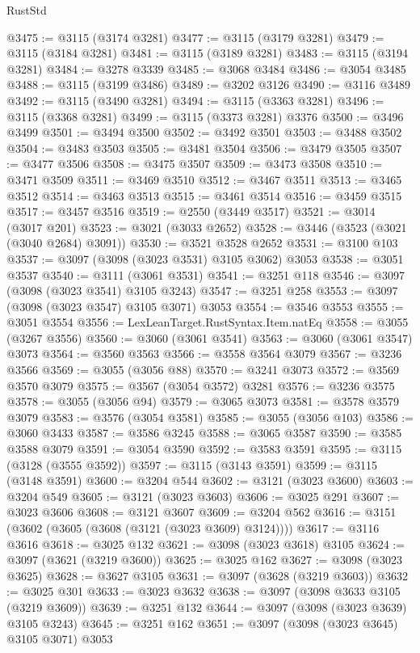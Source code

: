 \begin{lexlean}{RustStd}
\begin{coremodule}
{\begin{coremodule}
{{{{{{{{{{{{{{{{{{{{{{{{{{{{{{{{@3475 := @3115 (@3174 @3281)
@3477 := @3115 (@3179 @3281)
@3479 := @3115 (@3184 @3281)
@3481 := @3115 (@3189 @3281)
@3483 := @3115 (@3194 @3281)
@3484 := @3278 @3339
@3485 := @3068 @3484
@3486 := @3054 @3485
@3488 := @3115 (@3199 @3486)
@3489 := @3202 @3126
@3490 := @3116 @3489
@3492 := @3115 (@3490 @3281)
@3494 := @3115 (@3363 @3281)
@3496 := @3115 (@3368 @3281)
@3499 := @3115 (@3373 @3281) @3376
@3500 := @3496 @3499
@3501 := @3494 @3500
@3502 := @3492 @3501
@3503 := @3488 @3502
@3504 := @3483 @3503
@3505 := @3481 @3504
@3506 := @3479 @3505
@3507 := @3477 @3506
@3508 := @3475 @3507
@3509 := @3473 @3508
@3510 := @3471 @3509
@3511 := @3469 @3510
@3512 := @3467 @3511
@3513 := @3465 @3512
@3514 := @3463 @3513
@3515 := @3461 @3514
@3516 := @3459 @3515
@3517 := @3457 @3516
@3519 := @2550 (@3449 @3517)
@3521 := @3014 (@3017 @201)
@3523 := @3021 (@3033 @2652)
@3528 := @3446 (@3523 (@3021 (@3040 @2684) @3091))
@3530 := @3521 @3528 @2652
@3531 := @3100 @103
@3537 := @3097 (@3098 (@3023 @3531) @3105 @3062) @3053
@3538 := @3051 @3537
@3540 := @3111 (@3061 @3531)
@3541 := @3251 @118
@3546 := @3097 (@3098 (@3023 @3541) @3105 @3243)
@3547 := @3251 @258
@3553 := @3097 (@3098 (@3023 @3547) @3105 @3071) @3053
@3554 := @3546 @3553
@3555 := @3051 @3554
@3556 := LexLeanTarget.RustSyntax.Item.natEq
@3558 := @3055 (@3267 @3556)
@3560 := @3060 (@3061 @3541)
@3563 := @3060 (@3061 @3547) @3073
@3564 := @3560 @3563
@3566 := @3558 @3564 @3079
@3567 := @3236 @3566
@3569 := @3055 (@3056 @88)
@3570 := @3241 @3073
@3572 := @3569 @3570 @3079
@3575 := @3567 (@3054 @3572) @3281
@3576 := @3236 @3575
@3578 := @3055 (@3056 @94)
@3579 := @3065 @3073
@3581 := @3578 @3579 @3079
@3583 := @3576 (@3054 @3581)
@3585 := @3055 (@3056 @103)
@3586 := @3060 @3433
@3587 := @3586 @3245
@3588 := @3065 @3587
@3590 := @3585 @3588 @3079
@3591 := @3054 @3590
@3592 := @3583 @3591
@3595 := @3115 (@3128 (@3555 @3592))
@3597 := @3115 (@3143 @3591)
@3599 := @3115 (@3148 @3591)
@3600 := @3204 @544
@3602 := @3121 (@3023 @3600)
@3603 := @3204 @549
@3605 := @3121 (@3023 @3603)
@3606 := @3025 @291
@3607 := @3023 @3606
@3608 := @3121 @3607
@3609 := @3204 @562
@3616 := @3151 (@3602 (@3605 (@3608 (@3121 (@3023 @3609) @3124))))
@3617 := @3116 @3616
@3618 := @3025 @132
@3621 := @3098 (@3023 @3618) @3105
@3624 := @3097 (@3621 (@3219 @3600))
@3625 := @3025 @162
@3627 := @3098 (@3023 @3625)
@3628 := @3627 @3105
@3631 := @3097 (@3628 (@3219 @3603))
@3632 := @3025 @301
@3633 := @3023 @3632
@3638 := @3097 (@3098 @3633 @3105 (@3219 @3609))
@3639 := @3251 @132
@3644 := @3097 (@3098 (@3023 @3639) @3105 @3243)
@3645 := @3251 @162
@3651 := @3097 (@3098 (@3023 @3645) @3105 @3071) @3053
}}}}}}}}}}}}}}}}}}}}}}}}}}}}}}}}
\end{coremodule}}
\end{coremodule}
\end{lexlean}
